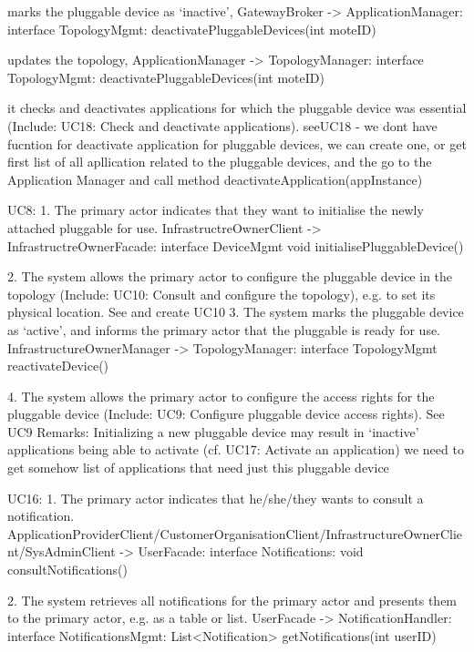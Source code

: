         { marks the pluggable device as `inactive',
           GatewayBroker -> ApplicationManager: interface TopologyMgmt: deactivatePluggableDevices(int moteID)
        { updates the topology,
           ApplicationManager -> TopologyManager: interface TopologyMgmt: deactivatePluggableDevices(int moteID)
        { it checks and deactivates applications for which the pluggable device was essential
        (Include: UC18: Check and deactivate applications).
        seeUC18 - we dont have fucntion for deactivate application for pluggable devices, we can create one, or get
                            first list of all apllication related to the pluggable devices, and the go to the Application Manager and
                            call method deactivateApplication(appInstance)

     UC8:
        1. The primary actor indicates that they want to initialise the newly attached pluggable for use.
            InfrastructreOwnerClient -> InfrastructreOwnerFacade: interface DeviceMgmt
                                void initialisePluggableDevice()

        2. The system allows the primary actor to configure the pluggable device in the topology
            (Include: UC10: Consult and configure the topology), e.g. to set its physical location.
             See and create UC10
        3. The system marks the pluggable device as `active', and informs the primary actor that the
            pluggable is ready for use.
            InfrastructureOwnerManager -> TopologyManager: interface TopologyMgmt reactivateDevice()

        4. The system allows the primary actor to configure the access rights for the pluggable device
            (Include: UC9: Configure pluggable device access rights).
            See UC9
         Remarks:
            Initializing a new pluggable device may result in `inactive' applications being able to activate
            (cf. UC17: Activate an application) we need to get somehow list of applications that need just this pluggable device

     UC16:
     1. The primary actor indicates that he/she/they wants to consult a notification.
            ApplicationProviderClient/CustomerOrganisationClient/InfrastructureOwnerClient/SysAdminClient -> UserFacade:
                    interface Notifications: void consultNotifications()

     2. The system retrieves all notifications for the primary actor and presents them to the primary
        actor, e.g. as a table or list.
        UserFacade -> NotificationHandler: interface NotificationsMgmt:
                List<Notification> getNotifications(int userID)


}}}
